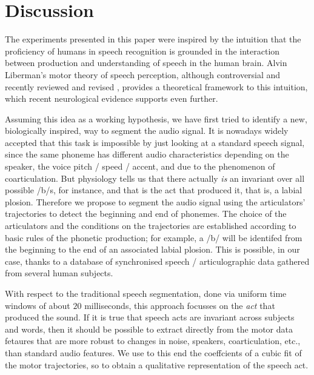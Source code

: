 \section{Discussion}
\label{sec:disc}

The experiments presented in this paper were inspired by the intuition that the
proficiency of humans in speech recognition is grounded in the interaction
between production and understanding of speech in the human brain. Alvin
Liberman's motor theory of speech perception, although controversial and
recently reviewed and revised \cite{liberman1,liberman2,galant,massaro},
provides a theoretical framework to this intuition, which recent neurological
evidence \cite{dausilio} supports even further.

Assuming this idea as a working hypothesis, we have first tried to identify
a new, biologically inspired, way to segment the audio signal. It is nowadays
widely accepted that this task is impossible by just looking at a standard
speech signal, since the same phoneme has different audio characteristics
depending on the speaker, the voice pitch / speed / accent, and due to the
phenomenon of coarticulation. But physiology tells us that there actually \emph{is} an invariant
over all possible /b/s, for instance, and that is the act that produced it,
that is, a labial plosion. Therefore we propose to segment the audio signal
using the articulators' trajectories to detect
the beginning and end of phonemes. The choice of the articulators and the
conditions on the trajectories are established according to basic rules of
the phonetic production; for example, a /b/ will be identifed from
the beginning to the end of an associated labial plosion. This is possible,
in our case, thanks to a database of synchronised speech / articulographic
data gathered from several human subjects.

With respect to the traditional speech segmentation, done via uniform time
windows of about $20$ milliseconds, this approach focusses on the \emph{act}
that produced the sound. If it is true that speech acts are invariant across
subjects and words, then it should be possible to extract directly from the motor data
fetaures that are more robust to changes in noise, speakers,
coarticulation, etc., than standard
audio features. We use to this end the coeffcients of a cubic fit of the
motor trajectories, so to obtain a qualitative representation of the speech
act.

%
%

